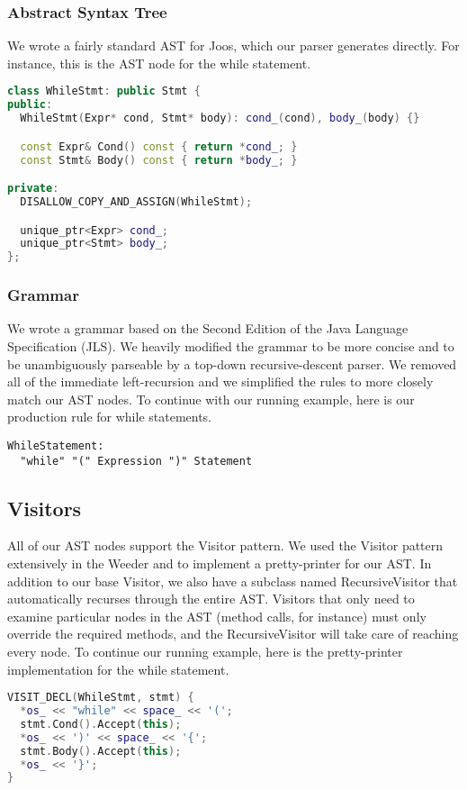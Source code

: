 \documentclass[12pt, titlepage]{article}
\begin{document}
\subsubsection{Abstract Syntax Tree}
We wrote a fairly standard AST for Joos, which our parser generates directly.
For instance, this is the AST node for the while statement.
\begin{lstlisting}[language=c++]
class WhileStmt: public Stmt {
public:
  WhileStmt(Expr* cond, Stmt* body): cond_(cond), body_(body) {}

  const Expr& Cond() const { return *cond_; }
  const Stmt& Body() const { return *body_; }

private:
  DISALLOW_COPY_AND_ASSIGN(WhileStmt);

  unique_ptr<Expr> cond_;
  unique_ptr<Stmt> body_;
};
\end{lstlisting}

\subsubsection{Grammar}
We wrote a grammar based on the Second Edition of the Java Language
Specification (JLS). We heavily modified the grammar to be more concise and to
be unambiguously parseable by a top-down recursive-descent parser. We removed
all of the immediate left-recursion and we simplified the rules to more closely
match our AST nodes. To continue with our running example, here is our
production rule for while statements.
\begin{lstlisting}
WhileStatement:
  "while" "(" Expression ")" Statement
\end{lstlisting}

\subsection{Visitors}
All of our AST nodes support the Visitor pattern. We used the Visitor pattern
extensively in the Weeder and to implement a pretty-printer for our AST. In
addition to our base Visitor, we also have a subclass named RecursiveVisitor
that automatically recurses through the entire AST. Visitors that only need to
examine particular nodes in the AST (method calls, for instance) must only
override the required methods, and the RecursiveVisitor will take care of
reaching every node. To continue our running example, here is the
pretty-printer implementation for the while statement.
\begin{lstlisting}[language=c++]
VISIT_DECL(WhileStmt, stmt) {
  *os_ << "while" << space_ << '(';
  stmt.Cond().Accept(this);
  *os_ << ')' << space_ << '{';
  stmt.Body().Accept(this);
  *os_ << '}';
}
\end{lstlisting}
\end{document}
